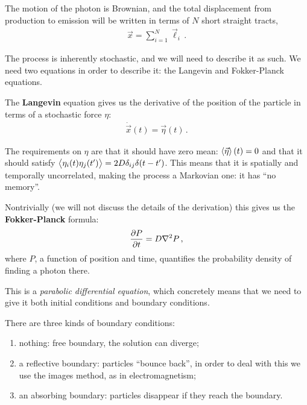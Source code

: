 \documentclass[main.tex]{subfiles}
\begin{document}

The motion of the photon is Brownian, and the total displacement from production to emission will be written in terms of \(N\) short straight tracts, 
%
\begin{align}
\vec{x} = \sum _{i=1}^{N} \vec{\ell}_i
\,.
\end{align}

The process is inherently stochastic, and we will need to describe it as such. 
We need two equations in order to describe it: the Langevin and Fokker-Planck equations.

The \textbf{Langevin} equation gives us the derivative of the position of the particle in terms of a stochastic force \(\eta\):
%
\begin{align}
  \dot{\vec{x}}(t) = \vec{\eta} (t)
\,.
\end{align}

The requirements on \(\eta \) are that it should have zero mean: \(\expval{\vec{\eta}}(t) = 0\) and that it should satisfy \(\expval{\eta _i (t) \eta_j (t')} = 2 D \delta_{ij} \delta (t - t')\).
This means that it is spatially and temporally uncorrelated, making the process a Markovian one: it has ``no memory''.


Nontrivially (we will not discuss the details of the derivation) this gives us the \textbf{Fokker-Planck} formula: 
%
\begin{align}
  \pdv{P}{t} = D \nabla^2 P 
\,,
\end{align}
%
where \(P\), a function of position and time, quantifies the probability density of finding a photon there.

This is a \emph{parabolic differential equation}, which concretely means that we need to give it both initial conditions and boundary conditions. 


There are three kinds of boundary conditions: 
\begin{enumerate}
  \item nothing: free boundary, the solution can diverge;
  \item a reflective boundary: particles ``bounce back'', in order to deal with this we use the images method, as in electromagnetism;
  \item an absorbing boundary: particles disappear if they reach the boundary. 
\end{enumerate}
\end{document}
